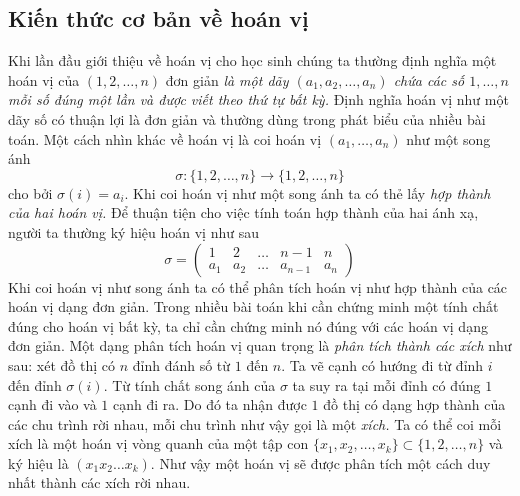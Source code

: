 \subsection{Kiến thức cơ bản về hoán vị}
Khi lần đầu giới thiệu về hoán vị cho học sinh chúng ta thường định nghĩa một hoán vị của $(1,2,\dots,n)$ đơn giản 
\textit{là một dãy $(a_1, a_2,\dots,a_n)$ chứa các số $1,\dots, n$ mỗi số đúng một lần và được viết theo thứ tự bất kỳ.}
Định nghĩa hoán vị như một dãy số có thuận lợi là đơn giản và thường dùng trong phát biểu của nhiều bài toán. Một cách nhìn khác về hoán vị là coi hoán vị $(a_1,\dots, a_n)$ như một song ánh $$\sigma:\{1,2,\dots,n\}\rightarrow \{1,2,\dots,n\}$$
cho bởi $\sigma(i)=a_i.$ Khi coi hoán vị như một song ánh ta có thẻ lấy \textit{hợp thành của hai hoán vị.} Để thuận tiện cho việc 
tính toán hợp thành của hai ánh xạ, người ta thường ký hiệu hoán vị như sau
$$\sigma = \begin{pmatrix}
			 1  &  2  &  \dots & n-1 & n \\ 
			a_1 & a_2 &  \dots &  a_{n-1} & a_n \end{pmatrix}$$
Khi coi hoán vị như song ánh ta có thể phân tích hoán vị như hợp thành của các hoán vị dạng đơn giản. Trong nhiều bài toán khi 
	cần chứng minh một tính chất đúng cho hoán vị bất kỳ, ta chỉ cần chứng minh nó đúng với các hoán vị dạng đơn giản. 	
	Một dạng phân tích hoán vị quan trọng là \textit{phân tích thành các xích} như sau: xét đồ thị có $n$ đỉnh đánh số từ $1$ đến 
	$n$. Ta vẽ cạnh có hướng đi từ đỉnh $i$ đến đỉnh $\sigma(i).$ Từ tính chất song ánh của $\sigma$ ta suy ra tại mỗi đỉnh có đúng 
	$1$ cạnh đi vào và $1$ cạnh đi ra. Do đó ta nhận được $1$ đồ thị có dạng hợp thành của các chu trình rời nhau, mỗi chu trình 
	như vậy gọi là một \textit{xích.} Ta có thể coi mỗi xích là một hoán vị vòng quanh của một tập con $\{x_1, x_2,\dots,x_k\}\subset
	\{1,2,\dots,n\}$ và ký hiệu là $(x_1 x_2 \dots x_k).$ Như vậy một hoán vị sẽ được phân tích một cách duy nhất thành các xích rời nhau.
